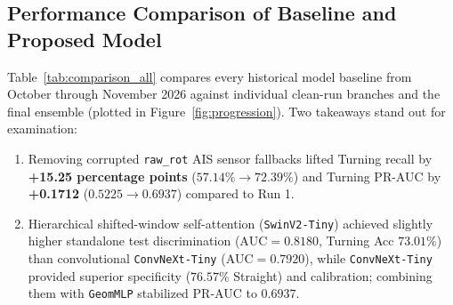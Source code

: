 \documentclass[11pt,a4paper]{article}
\begin{document}
\subsection{Performance Comparison of Baseline and Proposed Model}
Table~\ref{tab:comparison_all} compares every historical model baseline from October through November 2026 against individual clean-run branches and the final ensemble (plotted in Figure~\ref{fig:progression}). Two takeaways stand out for examination:
\begin{enumerate}[leftmargin=1.5em]
    \item Removing corrupted \texttt{raw\_rot} AIS sensor fallbacks lifted Turning recall by \textbf{+15.25 percentage points} ($57.14\% \rightarrow 72.39\%$) and Turning PR-AUC by \textbf{+0.1712} ($0.5225 \rightarrow 0.6937$) compared to Run 1.
    \item Hierarchical shifted-window self-attention (\texttt{SwinV2-Tiny}) achieved slightly higher standalone test discrimination ($\text{AUC}=0.8180$, Turning Acc $73.01\%$) than convolutional \texttt{ConvNeXt-Tiny} ($\text{AUC}=0.7920$), while \texttt{ConvNeXt-Tiny} provided superior specificity ($76.57\%$ Straight) and calibration; combining them with \texttt{GeomMLP} stabilized PR-AUC to $0.6937$.
\end{enumerate}
\end{document}
